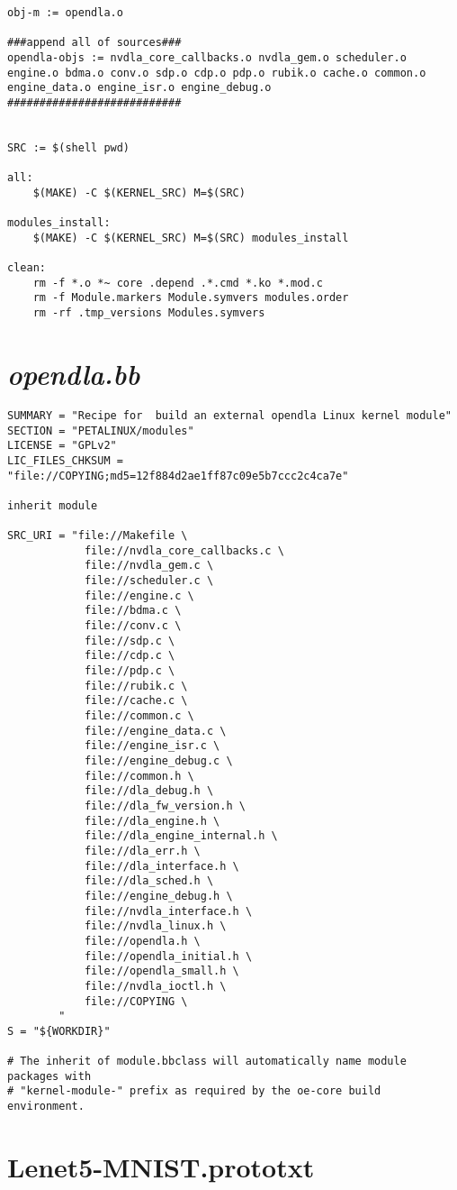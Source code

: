\begin{lstlisting}
obj-m := opendla.o

###append all of sources###
opendla-objs := nvdla_core_callbacks.o nvdla_gem.o scheduler.o engine.o bdma.o conv.o sdp.o cdp.o pdp.o rubik.o cache.o common.o engine_data.o engine_isr.o engine_debug.o
###########################


SRC := $(shell pwd)

all:
    $(MAKE) -C $(KERNEL_SRC) M=$(SRC)

modules_install:
    $(MAKE) -C $(KERNEL_SRC) M=$(SRC) modules_install

clean:
    rm -f *.o *~ core .depend .*.cmd *.ko *.mod.c
    rm -f Module.markers Module.symvers modules.order
    rm -rf .tmp_versions Modules.symvers
\end{lstlisting}

\section{\emph{opendla.bb}}

\begin{lstlisting}
SUMMARY = "Recipe for  build an external opendla Linux kernel module"
SECTION = "PETALINUX/modules"
LICENSE = "GPLv2"
LIC_FILES_CHKSUM = "file://COPYING;md5=12f884d2ae1ff87c09e5b7ccc2c4ca7e"

inherit module

SRC_URI = "file://Makefile \
            file://nvdla_core_callbacks.c \
            file://nvdla_gem.c \
            file://scheduler.c \
            file://engine.c \
            file://bdma.c \
            file://conv.c \
            file://sdp.c \
            file://cdp.c \
            file://pdp.c \
            file://rubik.c \
            file://cache.c \
            file://common.c \
            file://engine_data.c \
            file://engine_isr.c \
            file://engine_debug.c \
            file://common.h \
            file://dla_debug.h \
            file://dla_fw_version.h \
            file://dla_engine.h \
            file://dla_engine_internal.h \
            file://dla_err.h \
            file://dla_interface.h \
            file://dla_sched.h \
            file://engine_debug.h \
            file://nvdla_interface.h \
            file://nvdla_linux.h \
            file://opendla.h \
            file://opendla_initial.h \
            file://opendla_small.h \
            file://nvdla_ioctl.h \
            file://COPYING \
        "
S = "${WORKDIR}"

# The inherit of module.bbclass will automatically name module packages with
# "kernel-module-" prefix as required by the oe-core build environment.
\end{lstlisting}

\section{Lenet5-MNIST.prototxt}
